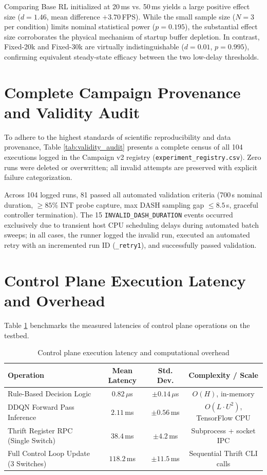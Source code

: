 \documentclass[12pt,a4paper,oneside]{report}
\begin{document}


Comparing Base RL initialized at 20\,ms vs. 50\,ms yields a large positive effect size ($d = 1.46$, mean difference $+3.70$\,FPS). While the small sample size ($N=3$ per condition) limits nominal statistical power ($p = 0.195$), the substantial effect size corroborates the physical mechanism of startup buffer depletion. In contrast, Fixed-20k and Fixed-30k are virtually indistinguishable ($d = 0.01$, $p = 0.995$), confirming equivalent steady-state efficacy between the two low-delay thresholds.


\section{Complete Campaign Provenance and Validity Audit}
\label{sec:validity_audit}
To adhere to the highest standards of scientific reproducibility and data provenance, Table \ref{tab:validity_audit} presents a complete census of all 104 executions logged in the Campaign v2 registry (\texttt{experiment\_registry.csv}). Zero runs were deleted or overwritten; all invalid attempts are preserved with explicit failure categorization.



Across 104 logged runs, 81 passed all automated validation criteria (700\,s nominal duration, $\ge 85\%$ INT probe capture, max DASH sampling gap $\le 8.5$\,s, graceful controller termination). The 15 \texttt{INVALID\_DASH\_DURATION} events occurred exclusively due to transient host CPU scheduling delays during automated batch sweeps; in all cases, the runner logged the invalid run, executed an automated retry with an incremented run ID (\texttt{\_retry1}), and successfully passed validation.


\section{Control Plane Execution Latency and Overhead}
\label{sec:latency_overhead}
Table \ref{tab:overhead} benchmarks the measured latencies of control plane operations on the testbed.

\begin{table}[H]
\centering
\caption{Control plane execution latency and computational overhead}
\label{tab:overhead}
\begin{tabular}{lccc}
\toprule
\textbf{Operation} & \textbf{Mean Latency} & \textbf{Std. Dev.} & \textbf{Complexity / Scale} \\
\midrule
Rule-Based Decision Logic & $0.82\,\mu$s & $\pm 0.14\,\mu$s & $O(H)$, in-memory \\
DDQN Forward Pass Inference & $2.11\,$ms & $\pm 0.56\,$ms & $O(L \cdot U^2)$, TensorFlow CPU \\
Thrift Register RPC (Single Switch) & $38.4\,$ms & $\pm 4.2\,$ms & Subprocess + socket IPC \\
Full Control Loop Update (3 Switches) & $118.2\,$ms & $\pm 11.5\,$ms & Sequential Thrift CLI calls \\
\bottomrule
\end{tabular}
\end{table}
\end{document}
